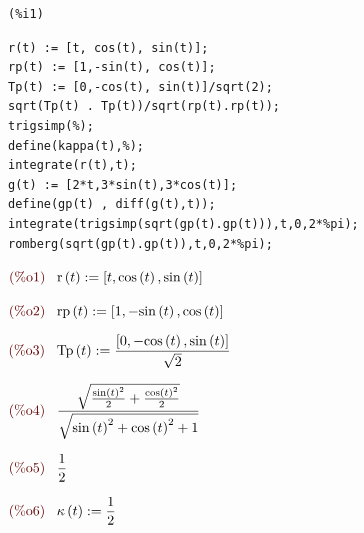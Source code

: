 \documentclass[12pt]{article}
\begin{document}
\noindent

\begin{minipage}[t]{8ex}{\color{red}\bf
\begin{verbatim}
(%i1) 
\end{verbatim}}
\end{minipage}
\begin{minipage}[t]{\textwidth}{\color{blue}
\begin{verbatim}
r(t) := [t, cos(t), sin(t)];
rp(t) := [1,-sin(t), cos(t)];
Tp(t) := [0,-cos(t), sin(t)]/sqrt(2);
sqrt(Tp(t) . Tp(t))/sqrt(rp(t).rp(t));
trigsimp(%);
define(kappa(t),%);
integrate(r(t),t);
g(t) := [2*t,3*sin(t),3*cos(t)];
define(gp(t) , diff(g(t),t));
integrate(trigsimp(sqrt(gp(t).gp(t))),t,0,2*%pi);
romberg(sqrt(gp(t).gp(t)),t,0,2*%pi);
\end{verbatim}}
\end{minipage}
\begin{math}\displaystyle
\parbox{8ex}{\color{labelcolor}(\%o1) }
\mathrm{r}\left( t\right) :=[t,\mathrm{cos}\left( t\right) ,\mathrm{sin}\left( t\right) ]
\end{math}

\begin{math}\displaystyle
\parbox{8ex}{\color{labelcolor}(\%o2) }
\mathrm{rp}\left( t\right) :=[1,-\mathrm{sin}\left( t\right) ,\mathrm{cos}\left( t\right) ]
\end{math}

\begin{math}\displaystyle
\parbox{8ex}{\color{labelcolor}(\%o3) }
\mathrm{Tp}\left( t\right) :=\frac{[0,-\mathrm{cos}\left( t\right) ,\mathrm{sin}\left( t\right) ]}{\sqrt{2}}
\end{math}

\begin{math}\displaystyle
\parbox{8ex}{\color{labelcolor}(\%o4) }
\frac{\sqrt{\frac{{\mathrm{sin}\left( t\right) }^{2}}{2}+\frac{{\mathrm{cos}\left( t\right) }^{2}}{2}}}{\sqrt{{\mathrm{sin}\left( t\right) }^{2}+{\mathrm{cos}\left( t\right) }^{2}+1}}
\end{math}

\begin{math}\displaystyle
\parbox{8ex}{\color{labelcolor}(\%o5) }
\frac{1}{2}
\end{math}

\begin{math}\displaystyle
\parbox{8ex}{\color{labelcolor}(\%o6) }
\kappa\left( t\right) :=\frac{1}{2}
\end{math}
\end{document}
